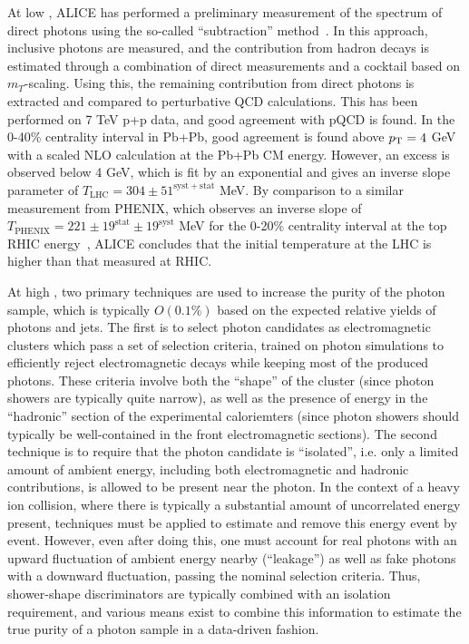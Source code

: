At low \pT, ALICE has performed a preliminary measurement of the spectrum of direct photons
using the so-called ``subtraction'' method~\cite{Wilde:2012wc}.  
In this approach, inclusive photons are measured,
and the contribution from hadron decays is estimated through a combination of direct measurements
and a cocktail based on $m_T$-scaling.
Using this, the remaining contribution from direct photons is extracted and compared to
perturbative QCD calculations.  This has been performed on 7 TeV p+p data, and good agreement
with pQCD is found.  In the 0-40\% centrality interval in Pb+Pb, good agreement is found above
$\mbox{$p_{\mathrm{T}}$}=4$ GeV with a scaled NLO calculation at the Pb+Pb CM energy.  However, an excess is observed
below 4 GeV, which is fit by an exponential and gives an inverse slope parameter of
$T_{\mathrm{LHC}} = 304 \pm 51^{\mathrm{syst+stat}}$ MeV.  By comparison to a similar
measurement from PHENIX, which observes an inverse slope of 
$T_{\mathrm{PHENIX}}=221 \pm 19^{\mathrm{stat}} \pm 19^{\mathrm{syst}}$ MeV for the 0-20\%
centrality interval at the top RHIC energy~\cite{Adare:2008ab},
ALICE concludes that the initial temperature at the LHC is higher
than that measured at RHIC.

At high \pT, two primary techniques are used to increase the purity of the photon sample, which is typically
$O(0.1\%)$ based on the expected relative yields of photons and jets.  The first is to select
photon candidates as electromagnetic clusters which pass a set of selection criteria, trained on
photon simulations to efficiently reject electromagnetic decays while keeping most of the
produced photons.  These criteria involve both the ``shape'' of the cluster (since photon showers
are typically quite narrow), as well as the presence of energy in the ``hadronic'' section of the
experimental caloriemters (since photon showers should typically be well-contained in the front
electromagnetic sections).
The second technique is to require that the photon candidate is ``isolated'', i.e. only a limited
amount of ambient energy, including both electromagnetic and hadronic contributions, 
is allowed to be present near the photon.  In the context of a heavy ion collision, where there
is typically a substantial amount of uncorrelated energy present, techniques must be applied to
estimate and remove this energy event by event.  However, even after doing this, one must account
for real photons with an upward fluctuation of ambient energy nearby (``leakage'') as well
as fake photons with a downward fluctuation, passing the nominal selection criteria. 
Thus, shower-shape discriminators are typically combined with an isolation requirement, and various
means exist to combine this information to estimate the true purity of a photon sample in a 
data-driven fashion.

